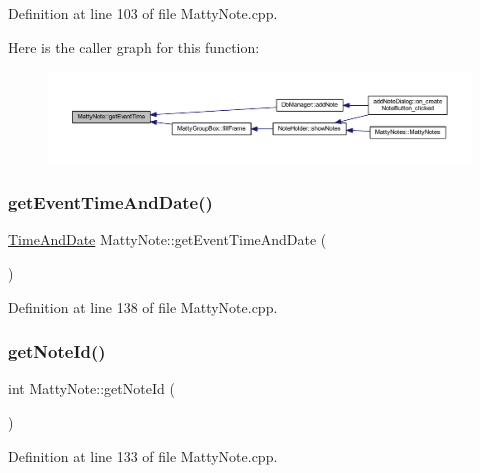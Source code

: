 Definition at line 103 of file Matty\+Note.\+cpp.

Here is the caller graph for this function\+:
\nopagebreak
\begin{figure}[H]
\begin{center}
\leavevmode
\includegraphics[width=350pt]{classMattyNote_a8c7f06ff44ce23f5a9ce6d2364732a24_icgraph}
\end{center}
\end{figure}
\hypertarget{classMattyNote_ac2579a4c26f27c8d86b6a57c81f5dc3b}{}\label{classMattyNote_ac2579a4c26f27c8d86b6a57c81f5dc3b} 
\subsubsection{\texorpdfstring{get\+Event\+Time\+And\+Date()}{getEventTimeAndDate()}}
{\footnotesize\ttfamily \hyperlink{structTimeAndDate}{Time\+And\+Date} Matty\+Note\+::get\+Event\+Time\+And\+Date (\begin{DoxyParamCaption}{ }\end{DoxyParamCaption})}



Definition at line 138 of file Matty\+Note.\+cpp.

\hypertarget{classMattyNote_ad7c5837f61e4813005ae063c67b9a0f0}{}\label{classMattyNote_ad7c5837f61e4813005ae063c67b9a0f0} 
\subsubsection{\texorpdfstring{get\+Note\+Id()}{getNoteId()}}
{\footnotesize\ttfamily int Matty\+Note\+::get\+Note\+Id (\begin{DoxyParamCaption}{ }\end{DoxyParamCaption})}



Definition at line 133 of file Matty\+Note.\+cpp.

